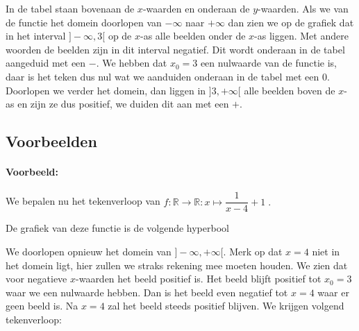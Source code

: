 \documentclass[12pt,twoside]{article}
\begin{document}
\begin{theorie}
In de tabel staan bovenaan de $x$-waarden en onderaan de $y$-waarden. Als we van de functie het domein doorlopen van $-\infty$ naar $+\infty$ dan zien we op de grafiek dat in het interval $]-\infty,3[$ op de $x$-as alle beelden onder de $x$-as liggen. Met andere woorden de beelden zijn in dit interval negatief. Dit wordt onderaan in de tabel aangeduid met een $-$. We hebben dat $x_0=3$ een nulwaarde van de functie is, daar is het teken dus nul wat we aanduiden onderaan in de tabel met een $0$. Doorlopen we verder het domein, dan liggen in $]3,+\infty[$ alle beelden boven de $x$-as en zijn ze dus positief, we duiden dit aan met een $+$.

\pagebreak
\subsection{Voorbeelden}

\paragraph{Voorbeeld:} We bepalen nu het tekenverloop van $f:\mathbb{R}\to\mathbb{R}:x\mapsto \dfrac{1}{x-4}+1\;.$

De grafiek van deze functie is de volgende hyperbool
\begin{center}
\end{center}

We doorlopen opnieuw het domein van $]-\infty, +\infty[$. Merk op dat $x=4$ niet in het domein ligt, hier zullen we straks rekening mee moeten houden. We zien dat voor negatieve $x$-waarden het beeld positief is. Het beeld blijft positief tot $x_0=3$ waar we een nulwaarde hebben. Dan is het beeld even negatief tot $x=4$ waar er geen beeld is. Na $x=4$ zal het beeld steeds positief blijven. We krijgen volgend tekenverloop:


\end{theorie}
\end{document}
